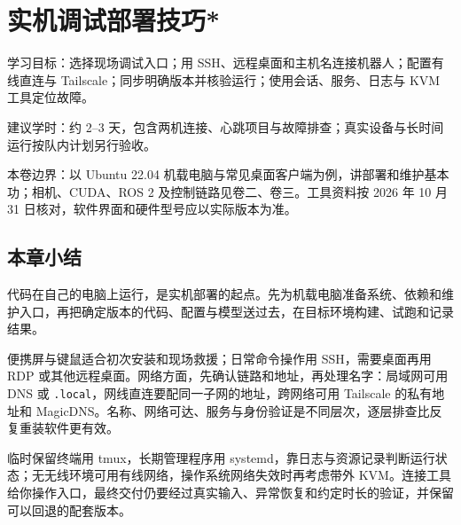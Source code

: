 \chapter{实机调试部署技巧*}
\label{chap:deployment}

\begin{introduction}
  \item 学习目标：选择现场调试入口；用 SSH、远程桌面和主机名连接机器人；配置有线直连与 Tailscale；同步明确版本并核验运行；使用会话、服务、日志与 KVM 工具定位故障。
  \item 建议学时：约 2--3 天，包含两机连接、心跳项目与故障排查；真实设备与长时间运行按队内计划另行验收。
  \item 本卷边界：以 Ubuntu 22.04 机载电脑与常见桌面客户端为例，讲部署和维护基本功；相机、CUDA、ROS 2 及控制链路见卷二、卷三。工具资料按 2026 年 10 月 31 日核对，软件界面和硬件型号应以实际版本为准。
\end{introduction}

\begingroup
\setlength{\emergencystretch}{3em}









\section{本章小结}
\begin{conclusion}
代码在自己的电脑上运行，是实机部署的起点。先为机载电脑准备系统、依赖和维护入口，再把确定版本的代码、配置与模型送过去，在目标环境构建、试跑和记录结果。

便携屏与键鼠适合初次安装和现场救援；日常命令操作用 SSH，需要桌面再用 RDP 或其他远程桌面。网络方面，先确认链路和地址，再处理名字：局域网可用 DNS 或 \texttt{.local}，网线直连要配同一子网的地址，跨网络可用 Tailscale 的私有地址和 MagicDNS。名称、网络可达、服务与身份验证是不同层次，逐层排查比反复重装软件更有效。

临时保留终端用 tmux，长期管理程序用 systemd，靠日志与资源记录判断运行状态；无无线环境可用有线网络，操作系统网络失效时再考虑带外 KVM。连接工具给你操作入口，最终交付仍要经过真实输入、异常恢复和约定时长的验证，并保留可以回退的配套版本。
\end{conclusion}

